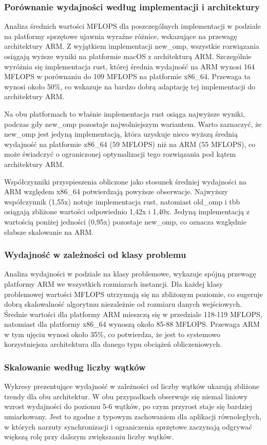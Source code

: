 \subsubsection{Porównanie wydajności według implementacji i architektury}
Analiza średnich wartości MFLOPS dla poszczególnych implementacji w podziale na platformy sprzętowe ujawnia wyraźne różnice, wskazujące na przewagę architektury ARM. Z wyjątkiem implementacji new\_omp, wszystkie rozwiązania osiągają wyższe wyniki na platformie macOS z architekturą ARM. Szczególnie wyróżnia się implementacja rust, której średnia wydajność na ARM wynosi 164 MFLOPS w porównaniu do 109 MFLOPS na platformie x86\_64. Przewaga ta wynosi około 50\%, co wskazuje na bardzo dobrą adaptację tej implementacji do architektury ARM.

Na obu platformach to właśnie implementacja rust osiąga najwyższe wyniki, podczas gdy new\_omp pozostaje najwolniejszym wariantem. Warto zaznaczyć, że new\_omp jest jedyną implementacją, która uzyskuje nieco wyższą średnią wydajność na platformie x86\_64 (59 MFLOPS) niż na ARM (55 MFLOPS), co może świadczyć o ograniczonej optymalizacji tego rozwiązania pod kątem architektury ARM.

Współczynniki przyspieszenia obliczone jako stosunek średniej wydajności na ARM względem x86\_64 potwierdzają powyższe obserwacje. Najwyższy współczynnik (1,55x) notuje implementacja rust, natomiast old\_omp i tbb osiągają zbliżone wartości odpowiednio 1,42x i 1,40x. Jedyną implementacją z wartością poniżej jedności (0,95x) pozostaje new\_omp, co oznacza względnie słabsze skalowanie na ARM.

\subsubsection{Wydajność w zależności od klasy problemu}
Analiza wydajności w podziale na klasy problemowe, wykazuje spójną przewagę platformy ARM we wszystkich rozmiarach instancji. Dla każdej klasy problemowej wartości MFLOPS utrzymują się na zbliżonym poziomie, co sugeruje dobrą skalowalność algorytmu niezależnie od rozmiaru danych wejściowych. Średnie wartości dla platformy ARM mieszczą się w przedziale 118-119 MFLOPS, natomiast dla platformy x86\_64 wynoszą około 85-88 MFLOPS. Przewaga ARM w tym ujęciu wynosi około 35\%, co potwierdza, że jest to systemowo korzystniejsza architektura dla danego typu obciążeń obliczeniowych.


\subsubsection{Skalowanie według liczby wątków}
Wykresy prezentujące wydajność w zależności od liczby wątków ukazują zbliżone trendy dla obu architektur. W obu przypadkach obserwuje się niemal liniowy wzrost wydajności do poziomu 5-6 wątków, po czym przyrost staje się bardziej umiarkowany. Jest to zgodne z typowym zachowaniem dla aplikacji równoległych, w których narzuty synchronizacji i ograniczenia sprzętowe zaczynają odgrywać większą rolę przy dalszym zwiększaniu liczby wątków.

